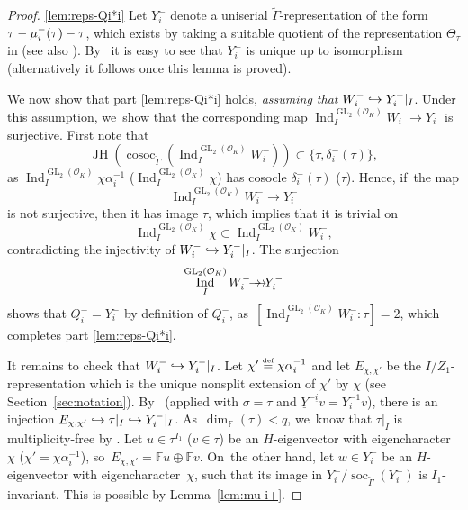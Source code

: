 \documentclass[JEP,XML,SOM,Unicode,NoFloatCountersInSection, NoEqCountersInSection,published]{cedram}
\newcommand\hto{\mathrel{\lhook\joinrel\to}}
\newcommand{\onto}{\mathchoice{\to\hspace*{-5mm}\to}{\mathrel{\hbox{$\to\hspace*{-2.85mm}\to$}}}{\to\hspace*{-3mm}\to}{\to\hspace*{-3mm}\to}}
\let\wt\widetilde
\newcommand{\defeq}{\stackrel{\textrm{\tiny{\upshape{def}}}}{=}}
\newcommand{\F}{\mathbb{F}}
\newcommand{\cO}{\mathcal{O}}
\DeclareMathOperator{\cosoc}{cosoc}
\DeclareMathOperator{\GL}{GL}
\DeclareMathOperator{\Ind}{Ind}
\DeclareMathOperator{\JH}{\mathrm{JH}}
\DeclareMathOperator{\soc}{soc}
\theoremstyle{plain}
\theoremstyle{definition}
\begin{document}
\skpt
\begin{proof}
\eqref{lem:reps-Qi*i}
Let $Y_i^-$
denote a uniserial $\wt\Gamma$-representation of the form $\tau \-- \mu_i^-(\tau) \-- \tau$, which exists by taking a suitable quotient of the representation $\Theta_\tau$ in \cite[Prop.\,3.12]{HuWang2} (see also \cite[Cor.\,3.16]{HuWang2}). By~\cite[Lem.\,2.10]{HuWang2} it is easy to see that $Y_i^-$ is unique up to isomorphism (alternatively it follows once this lemma is proved).

We now show that part \eqref{lem:reps-Qi*i} holds, \emph{assuming that} $W_i^- \hto Y_i^-|_I$.
Under this assumption, we~show that the corresponding map $\Ind_I^{\GL_2(\cO_K)} W_i^- \to Y_i^-$ is surjective.
First note that
\[
\JH(\cosoc_{\wt\Gamma} (\Ind_I^{\GL_2(\cO_K)} W_i^-)) \subset \{ \tau, \delta_i^-(\tau)\},
\]
as $\Ind_I^{\GL_2(\cO_K)} \chi\alpha_i^{-1}$ (\resp $\Ind_I^{\GL_2(\cO_K)} \chi$) has cosocle $\delta_i^-(\tau)$ (\resp $\tau$).
Hence, if~the map
\[
\Ind_I^{\GL_2(\cO_K)} W_i^- \to Y_i^-
\]
is not surjective, then it has image $\tau$, which implies that it is trivial on
\[
\Ind_I^{\GL_2(\cO_K)} \chi \subset \Ind_I^{\GL_2(\cO_K)} W_i^-,
\]
contradicting the injectivity of $W_i^- \hto Y_i^-|_I$.
The surjection
\[
\Ind_I^{\GL_2(\cO_K)} W_i^- \onto Y_i^-
\]
shows that $Q_i^- = Y_i^-$ by definition of $Q_i^-$, as~$[\Ind_I^{\GL_2(\cO_K)} W_i^-:\tau]=2$, which completes part \eqref{lem:reps-Qi*i}.

It remains to check that $W_i^- \hto Y_i^-|_I$.
Let $\chi'\defeq \chi\alpha_i^{-1}$ and let $E_{\chi,\chi'}$ be the $I/Z_1$\nobreakdash-representation which is the unique nonsplit extension of $\chi'$ by $\chi$ (see Section~\ref{sec:notation}). By~\cite[Lem.\,3.42(ii)]{BHHMS2} (applied with $\sigma=\tau$ and $\underline{Y}^{-\underline{i}}v=Y_i^{-1}v$),
there is an injection $E_{\chi,\chi'} \hto \tau|_I \hto Y_i^-|_I$. As~$\dim_\F(\tau) < q$, we~know that $\tau|_I$ is multiplicity-free by \cite[Lem.\,2.7]{BP}.
Let $u \in \tau^{I_1}$ (\resp $v\in \tau$) be an $H$-eigenvector with eigencharacter~$\chi$ (\resp $\chi'=\chi\alpha_i^{-1}$), so~$E_{\chi,\chi'} = \F u \oplus \F v$. On~the other hand, let $w\in Y_i^-$ be an $H$\nobreakdash-eigenvector with eigencharacter~$\chi$, such that its image in $Y_i^-/\soc_{\wt\Gamma}(Y_i^-)$ is $I_1$-invariant.
This is possible by Lemma~\ref{lem:mu-i+}.


\end{proof}
\end{document}
